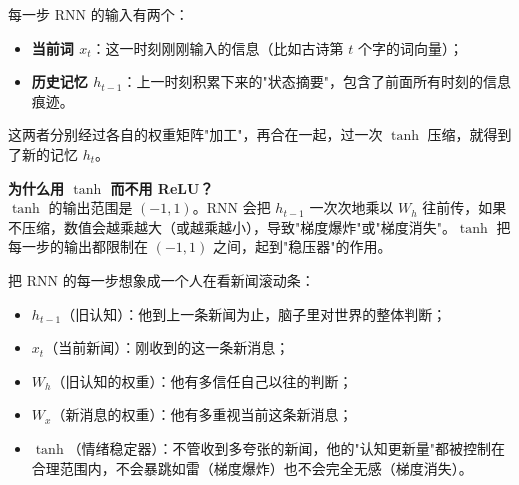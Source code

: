 \documentclass[a4paper,11pt]{ctexart}
\begin{document}
\begin{beginnerbox}
    每一步 RNN 的输入有两个：
    \begin{itemize}
        \item \textbf{当前词 $x_t$}：这一时刻刚刚输入的信息（比如古诗第 $t$ 个字的词向量）；
        \item \textbf{历史记忆 $h_{t-1}$}：上一时刻积累下来的"状态摘要"，包含了前面所有时刻的信息痕迹。
    \end{itemize}
    这两者分别经过各自的权重矩阵"加工"，再合在一起，过一次 $\tanh$ 压缩，就得到了新的记忆 $h_t$。

    \textbf{为什么用 $\tanh$ 而不用 ReLU？}\\
    $\tanh$ 的输出范围是 $(-1, 1)$。RNN 会把 $h_{t-1}$ 一次次地乘以 $W_h$ 往前传，如果不压缩，数值会越乘越大（或越乘越小），导致"梯度爆炸"或"梯度消失"。$\tanh$ 把每一步的输出都限制在 $(-1,1)$ 之间，起到"稳压器"的作用。
\end{beginnerbox}

\begin{metaphorbox}
    把 RNN 的每一步想象成一个人在看新闻滚动条：

    \begin{itemize}
        \item $h_{t-1}$（旧认知）：他到上一条新闻为止，脑子里对世界的整体判断；
        \item $x_t$（当前新闻）：刚收到的这一条新消息；
        \item $W_h$（旧认知的权重）：他有多信任自己以往的判断；
        \item $W_x$（新消息的权重）：他有多重视当前这条新消息；
        \item $\tanh$（情绪稳定器）：不管收到多夸张的新闻，他的"认知更新量"都被控制在合理范围内，不会暴跳如雷（梯度爆炸）也不会完全无感（梯度消失）。
    \end{itemize}
\end{metaphorbox}
\end{document}
